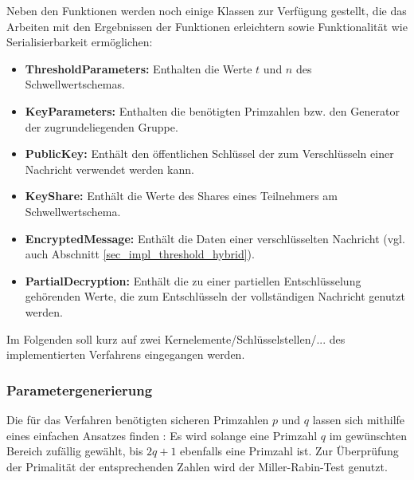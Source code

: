 Neben den Funktionen werden noch einige Klassen zur Verfügung gestellt, die das Arbeiten mit den Ergebnissen der Funktionen erleichtern sowie Funktionalität wie Serialisierbarkeit ermöglichen:

\begin{itemize}
  \item \textbf{ThresholdParameters: } Enthalten die Werte \(t\) und \(n\) des Schwellwertschemas.
  \item \textbf{KeyParameters: } Enthalten die benötigten Primzahlen bzw. den Generator der zugrundeliegenden Gruppe.
  \item \textbf{PublicKey: } Enthält den öffentlichen Schlüssel der zum Verschlüsseln einer Nachricht verwendet werden kann.
  \item \textbf{KeyShare: } Enthält die Werte des Shares eines Teilnehmers am Schwellwertschema.
  \item \textbf{EncryptedMessage: } Enthält die Daten einer verschlüsselten Nachricht (vgl. auch Abschnitt \ref{sec_impl_threshold_hybrid}).
  \item \textbf{PartialDecryption: } Enthält die zu einer partiellen Entschlüsselung gehörenden Werte, die zum Entschlüsseln der vollständigen Nachricht genutzt werden.
\end{itemize}

Im Folgenden soll kurz auf zwei Kernelemente/Schlüsselstellen/... des implementierten Verfahrens eingegangen werden.

  \subsubsection{Parametergenerierung}
  
  \label{sec_impl_threshold_keyparams}
  


  Die für das Verfahren benötigten sicheren Primzahlen \(p\) und \(q\) lassen sich mithilfe eines einfachen Ansatzes finden \cite{hoc1996}: Es wird solange eine Primzahl \(q\) im gewünschten Bereich zufällig gewählt, bis \(2q + 1\) ebenfalls eine Primzahl ist. Zur Überprüfung der Primalität der entsprechenden Zahlen wird der Miller-Rabin-Test genutzt.
  
